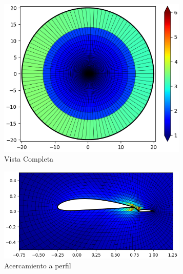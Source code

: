 \documentclass[letterpaper, openright, 12pt]{book}
\begin{document}
    \begin{figure}[htbp!]
        \centering
        \begin{subfigure}[c]{0.48\textwidth}
            \includegraphics[keepaspectratio,
                width=0.99\textwidth]{./img/naca4415_flap_aspect_far}
            \caption{Vista Completa}
            \label{fig:naca4415_flap_aspect_far}
        \end{subfigure}
        \hfill
        \begin{subfigure}[c]{0.48\textwidth}
            \includegraphics[keepaspectratio, width=0.99\textwidth]
                {./img/naca4415_flap_aspect_close}
            \caption{Acercamiento a perfil}
            \label{fig:naca4415_flap_aspect_close}
        \end{subfigure}
        \begin{subfigure}[c]{0.48\textwidth}

\end{subfigure}
\end{figure}
\end{document}
